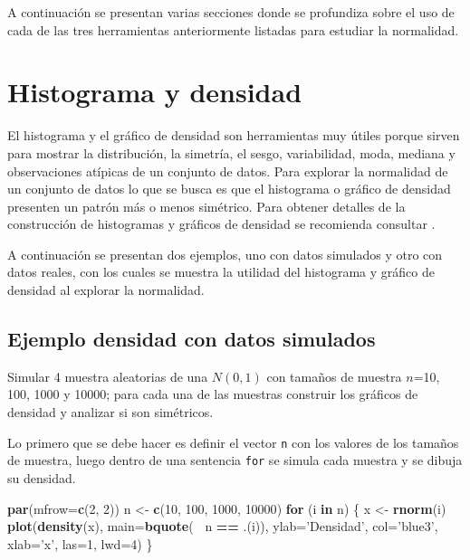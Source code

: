 \documentclass[10pt,]{krantz}
\makeatletter
\newenvironment{Shaded}{\begin{snugshade}}{\end{snugshade}}
\newcommand{\KeywordTok}[1]{\textcolor[rgb]{0.13,0.29,0.53}{\textbf{#1}}}
\newcommand{\DataTypeTok}[1]{\textcolor[rgb]{0.13,0.29,0.53}{#1}}
\newcommand{\DecValTok}[1]{\textcolor[rgb]{0.00,0.00,0.81}{#1}}
\newcommand{\StringTok}[1]{\textcolor[rgb]{0.31,0.60,0.02}{#1}}
\newcommand{\ControlFlowTok}[1]{\textcolor[rgb]{0.13,0.29,0.53}{\textbf{#1}}}
\newcommand{\OperatorTok}[1]{\textcolor[rgb]{0.81,0.36,0.00}{\textbf{#1}}}
\newcommand{\NormalTok}[1]{#1}
\newenvironment{kframe}{%
\medskip{}
\setlength{\fboxsep}{.8em}
 \def\at@end@of@kframe{}%
 \ifinner\ifhmode%
  \def\at@end@of@kframe{\end{minipage}}%
  \begin{minipage}{\columnwidth}%
 \fi\fi%
 \def\FrameCommand##1{\hskip\@totalleftmargin \hskip-\fboxsep
 \colorbox{shadecolor}{##1}\hskip-\fboxsep
     \hskip-\linewidth \hskip-\@totalleftmargin \hskip\columnwidth}%
 \MakeFramed {\advance\hsize-\width
   \@totalleftmargin\z@ \linewidth\hsize
   \@setminipage}}%
 {\par\unskip\endMakeFramed%
 \at@end@of@kframe}
\renewenvironment{Shaded}{\begin{kframe}}{\end{kframe}}
\makeatother
\begin{document}
A continuación se presentan varias secciones donde se profundiza sobre
el uso de cada de las tres herramientas anteriormente listadas para
estudiar la normalidad.

\section{Histograma y densidad}\label{histograma-y-densidad}

El histograma y el gráfico de densidad son herramientas muy útiles
porque sirven para mostrar la distribución, la simetría, el sesgo,
variabilidad, moda, mediana y observaciones atípicas de un conjunto de
datos. Para explorar la normalidad de un conjunto de datos lo que se
busca es que el histograma o gráfico de densidad presenten un patrón más
o menos simétrico. Para obtener detalles de la construcción de
histogramas y gráficos de densidad se recomienda consultar
\citet{hernandez_correa}.

A continuación se presentan dos ejemplos, uno con datos simulados y otro
con datos reales, con los cuales se muestra la utilidad del histograma y
gráfico de densidad al explorar la normalidad.

\subsection*{Ejemplo densidad con datos
simulados}\label{ejemplo-densidad-con-datos-simulados}


Simular 4 muestra aleatorias de una \(N(0, 1)\) con tamaños de muestra
\(n\)=10, 100, 1000 y 10000; para cada una de las muestras construir los
gráficos de densidad y analizar si son simétricos.

Lo primero que se debe hacer es definir el vector \texttt{n} con los
valores de los tamaños de muestra, luego dentro de una sentencia
\texttt{for} se simula cada muestra y se dibuja su densidad.

\begin{Shaded}
\begin{Highlighting}[]
\KeywordTok{par}\NormalTok{(}\DataTypeTok{mfrow=}\KeywordTok{c}\NormalTok{(}\DecValTok{2}\NormalTok{, }\DecValTok{2}\NormalTok{))}
\NormalTok{n <-}\StringTok{ }\KeywordTok{c}\NormalTok{(}\DecValTok{10}\NormalTok{, }\DecValTok{100}\NormalTok{, }\DecValTok{1000}\NormalTok{, }\DecValTok{10000}\NormalTok{)}
\ControlFlowTok{for}\NormalTok{ (i }\ControlFlowTok{in}\NormalTok{ n) \{}
\NormalTok{  x <-}\StringTok{ }\KeywordTok{rnorm}\NormalTok{(i)}
  \KeywordTok{plot}\NormalTok{(}\KeywordTok{density}\NormalTok{(x), }\DataTypeTok{main=}\KeywordTok{bquote}\NormalTok{(}\OperatorTok{~}\StringTok{ }\NormalTok{n }\OperatorTok{==}\StringTok{ }\NormalTok{.(i)),}
       \DataTypeTok{ylab=}\StringTok{'Densidad'}\NormalTok{, }\DataTypeTok{col=}\StringTok{'blue3'}\NormalTok{, }\DataTypeTok{xlab=}\StringTok{'x'}\NormalTok{, }\DataTypeTok{las=}\DecValTok{1}\NormalTok{, }\DataTypeTok{lwd=}\DecValTok{4}\NormalTok{)}
\NormalTok{\}}
\end{Highlighting}
\end{Shaded}
\end{document}
